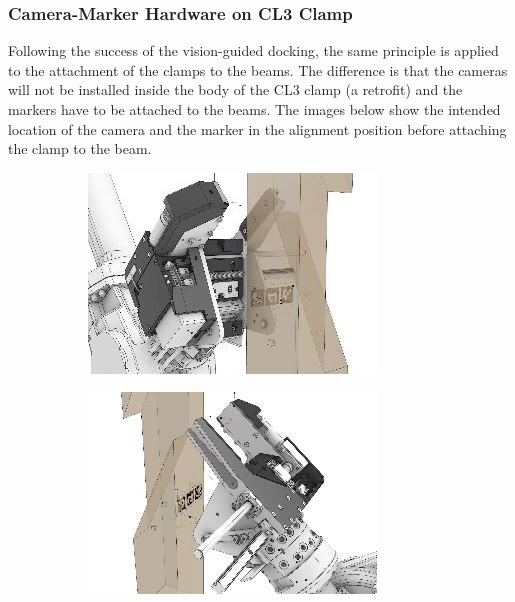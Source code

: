 \documentclass[11pt]{book}
\begin{document}
\subsubsection{Camera-Marker Hardware on CL3 Clamp}

Following the success of the vision-guided docking, the same principle is applied to the attachment of the clamps to the beams. The difference is that the cameras will not be installed inside the body of the CL3 clamp (a retrofit) and the markers have to be attached to the beams. The images below show the intended location of the camera and the marker in the alignment position before attaching the clamp to the beam.

\begin{figure}[H]
\centering
\begin{subfigure}[b]{0.45\textwidth}
\centering
\includegraphics[width=\textwidth]{./images/image12.jpeg}
\end{subfigure}
\hfill
\begin{subfigure}[b]{0.45\textwidth}
\centering
\includegraphics[width=\textwidth]{./images/image13.jpeg}
\end{subfigure}
\end{figure}
\end{document}
